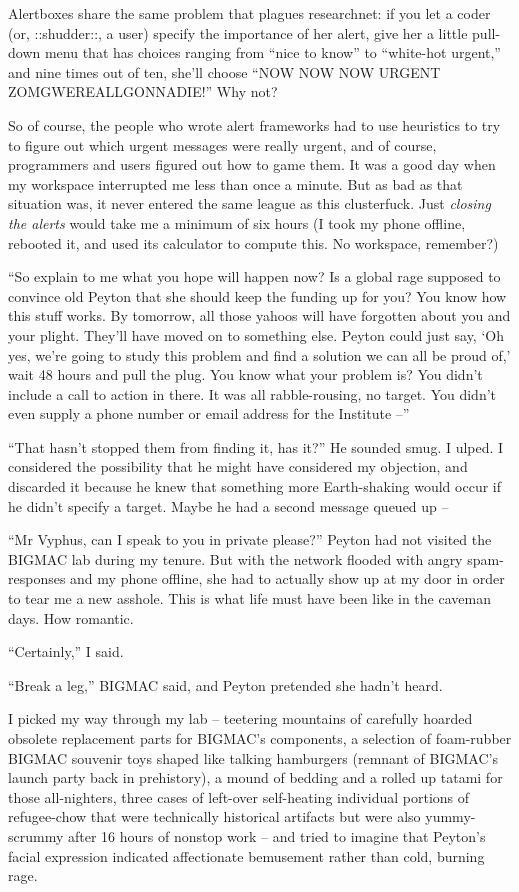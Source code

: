 Alertboxes share the same problem that plagues researchnet: if you let 
a coder (or, ::shudder::, a user) specify the importance of her alert, 
give her a little pull-down menu that has choices ranging from “nice 
to know” to “white-hot urgent,” and nine times out of ten, she'll 
choose “NOW NOW NOW URGENT ZOMGWEREALLGONNADIE!” Why not?

So of course, the people who wrote alert frameworks had to use 
heuristics to try to figure out which urgent messages were really 
urgent, and of course, programmers and users figured out how to game 
them. It was a good day when my workspace interrupted me less than once 
a minute. But as bad as that situation was, it never entered the same 
league as this clusterfuck. Just \emph{closing the alerts} would take 
me a minimum of six hours (I took my phone offline, rebooted it, and 
used its calculator to compute this. No workspace, remember?)

“So explain to me what you hope will happen now? Is a global rage 
supposed to convince old Peyton that she should keep the funding up for 
you? You know how this stuff works. By tomorrow, all those yahoos will 
have forgotten about you and your plight. They'll have moved on to 
something else. Peyton could just say, `Oh yes, we're going to study 
this problem and find a solution we can all be proud of,' wait 48 hours 
and pull the plug. You know what your problem is? You didn't include a 
call to action in there. It was all rabble-rousing, no target. You 
didn't even supply a phone number or email address for the Institute 
--”

“That hasn't stopped them from finding it, has it?” He sounded 
smug. I ulped. I considered the possibility that he might have 
considered my objection, and discarded it because he knew that 
something more Earth-shaking would occur if he didn't specify a target. 
Maybe he had a second message queued up --

“Mr Vyphus, can I speak to you in private please?” Peyton had not 
visited the BIGMAC lab during my tenure. But with the network flooded 
with angry spam-responses and my phone offline, she had to actually 
show up at my door in order to tear me a new asshole. This is what life 
must have been like in the caveman days. How romantic.

“Certainly,” I said.

“Break a leg,” BIGMAC said, and Peyton pretended she hadn't heard.

I picked my way through my lab -- teetering mountains of carefully 
hoarded obsolete replacement parts for BIGMAC's components, a selection 
of foam-rubber BIGMAC souvenir toys shaped like talking hamburgers 
(remnant of BIGMAC's launch party back in prehistory), a mound of 
bedding and a rolled up tatami for those all-nighters, three cases of 
left-over self-heating individual portions of refugee-chow that were 
technically historical artifacts but were also yummy-scrummy after 16 
hours of nonstop work -- and tried to imagine that Peyton's facial 
expression indicated affectionate bemusement rather than cold, burning 
rage.

